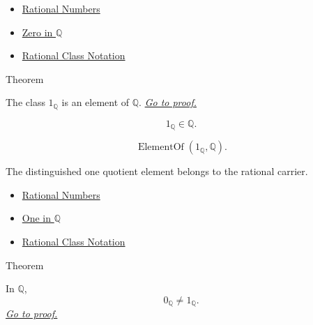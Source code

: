 \begin{dependencies}
\begin{itemize}
  \item \hyperref[def:rationals]{Rational Numbers}
  \item \hyperref[def:zero-in-q]{Zero in $\mathbb{Q}$}
  \item \hyperref[def:rational-class-notation]{Rational Class Notation}
\end{itemize}
\end{dependencies}

\begin{theorembox}{Theorem}
\begin{theorem}
\label{thm:one-is-a-rational}
The class $1_{\mathbb{Q}}$ is an element of $\mathbb{Q}$.
\hyperref[prf:one-is-a-rational]{\textit{Go to proof.}}
\end{theorem}
\end{theorembox}

\begin{remark*}
\[
1_{\mathbb{Q}}\in\mathbb{Q}.
\]
\end{remark*}

\begin{remark*}
\[
\operatorname{ElementOf}(1_{\mathbb{Q}},\mathbb{Q}).
\]
\end{remark*}

\begin{remark*}[Interpretation]
The distinguished one quotient element belongs to the rational carrier.
\end{remark*}

\begin{dependencies}
\begin{itemize}
  \item \hyperref[def:rationals]{Rational Numbers}
  \item \hyperref[def:one-in-q]{One in $\mathbb{Q}$}
  \item \hyperref[def:rational-class-notation]{Rational Class Notation}
\end{itemize}
\end{dependencies}

\begin{theorembox}{Theorem}
\begin{theorem}
\label{thm:zero-not-one-in-q}
In $\mathbb{Q}$,
\[
0_{\mathbb{Q}}\ne 1_{\mathbb{Q}}.
\]
\hyperref[prf:zero-not-one-in-q]{\textit{Go to proof.}}
\end{theorem}
\end{theorembox}

